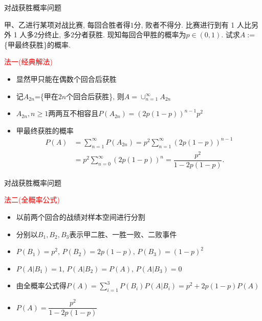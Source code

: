 \begin{frame}{对战获胜概率问题}
	\begin{exam}
		甲、乙进行某项对战比赛, 每回合胜者得$1$分, 败者不得分. 比赛进行到有 1 人比另外 1 人多$2$分终止, 多$2$分者获胜. 现知每回合甲胜的概率为$p\in (0,1)$. 试求$A:=$\{甲最终获胜\}的概率.
	\end{exam}

	\begin{jieda}
		\textcolor{red}{法一(经典解法)}
		\begin{itemize}[<+-|alert@+>]
			\item 显然甲只能在偶数个回合后获胜
			\item 记$A_{2n}$=\{甲在$2n$个回合后获胜\}, \pause 则$A=\cup_{n=1}^\infty A_{2n}$\pause
			\item $A_{2n}, n\geq 1$两两互不相容且\pause $P(A_{2n})=(2p(1-p))^{n-1}p^2$
			\item 甲最终获胜的概率
			\begin{align*}
				P(A)&=\sum_{n=1}^{\infty}P(A_{2n})=p^2\sum_{n=1}^{\infty}(2p(1-p))^{n-1}\\
				&=p^2\sum_{n=0}^{\infty}(2p(1-p))^{n}=\dfrac{p^2}{1-2p(1-p)}.
			\end{align*}
		\end{itemize}
	\end{jieda}
\end{frame}

\begin{frame}{对战获胜概率问题}
	\begin{jieda}
		\textcolor{red}{法二(全概率公式)}
		\begin{itemize}[<+-|alert@+>]
			\item 以前两个回合的战绩对样本空间进行分割
			\item 分别以$B_1,B_2,B_3$表示甲二胜、一胜一败、二败事件
			\item $P(B_1)=p^2,\,P(B_2)=2p(1-p),\,P(B_3)=(1-p)^2$
			\item $P(A|B_1)=1,\,P(A|B_2)=P(A),\,P(A|B_3)=0$
			\item 由全概率公式得$P(A)=\sum\limits_{i=1}^{3}P(B_i)P(A|B_i)=p^2+2p(1-p)P(A)$
			\item $P(A)=\dfrac{p^2}{1-2p(1-p)}$
		\end{itemize}
	\end{jieda}
\end{frame}

